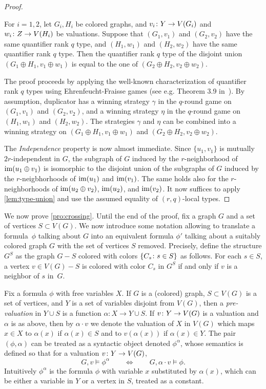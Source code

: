 \begin{proof}
		\begin{claim}\label{lem:type-union}
			For $i=1,2$, let $G_i,H_i$ be colored graphs,
			and $v_i\colon Y\to V(G_i)$ and $w_i\colon Z\to V(H_i)$ be valuations.
			Suppose that $(G_1,v_1)$ and $(G_2,v_2)$ 
			have the same quantifier rank $q$ type,
			and $(H_1,w_1)$ and $(H_2,w_2)$ 
			have the same quantifier rank $q$ type.
			Then the quantifier rank $q$ type of the disjoint union 
			$(G_1\oplus H_1,v_1\oplus w_1)$ is equal to the one of $(G_2\oplus H_2,v_2\oplus w_2)$. \end{claim}
\begin{clproof}[Sketch]
	The proof proceeds by applying the well-known characterization 
	of quantifier rank $q$  types using Ehrenfeucht-Fraisse games (see e.g. Theorem 3.9 in~\cite{libkin}). By assumption, duplicator has a winning strategy $\gamma$ in the $q$-round game on $(G_1,v_1)$ and $(G_2,v_2)$, and a winning strategy $\eta$ in the $q$-round game on $(H_1,w_1)$ and $(H_2,w_2)$. The strategies $\gamma$ and $\eta$ can be combined into a winning strategy on $(G_1\oplus H_1,v_1\oplus w_1)$  and $(G_2\oplus H_2,v_2\oplus w_2)$.
\end{clproof}
The \emph{Independence} property is now almost immediate. Since $\{u_1,v_1\}$ is mutually $2r$-independent in $G$, the subgraph of $G$ induced by the $r$-neighborhood of $\mathrm{im}(u_1\oplus v_1)$ is isomorphic to the disjoint union of the subgraphs of $G$ induced by the $r$-neigbhorhoods of $\mathrm{im}(u_1)$ and $\mathrm{im}(v_1)$. The same holds also for the $r$-neighborhoods of $\mathrm{im}(u_2\oplus v_2)$, 
$\mathrm{im}(u_2)$, and $\mathrm{im}(v_2)$. It now suffices to apply \cref{lem:type-union} and use the assumed equality of $(r,q)$-local types.
\end{proof}

We now prove \cref{pro:crossing}. Until the end of the proof, fix a graph $G$ and a set of vertices $S\subset V(G)$.
We now introduce some notation allowing to translate a  formula~$\phi$ talking about  $G$ into an equivalent formula $\phi'$ talking 
about a suitably colored  graph $G$ with the set of vertices $S$ removed.
Precisely, define the structure $G^{S}$
as the graph $G-S$ colored with colors $\{C_s\colon s\in S\}$ as follows.
For each $s\in S$, a vertex $v\in V(G)-S$
is colored with color $C_s$ in $G^S$ if and only if $v$ is a neighbor of $s$
in~$G$.

Fix a formula $\phi$ with free variables $X$.
If $G$ is a (colored) graph, $S\subset V(G)$ is a set of vertices, and $Y$ is a set of variables disjoint from $V(G)$, then 
a \emph{pre-valuation} in $Y\cup S$ is a 
function $\alpha\colon X\to Y\cup S$.
If $v\colon Y\to V(G)$ is a valuation and $\alpha$ is as above,
then by $\alpha\cdot v$ we denote the valuation of $X$ in $V(G)$
which maps $x\in X$ to $\alpha(x) $ if $\alpha(x)\in S$
and to $v(\alpha(x))$ if $\alpha(x)\in Y$.
 The  pair $(\phi,\alpha)$  can be treated as a
syntactic object denoted  $\phi^{\alpha}$,
 whose semantics is defined so that for a valuation $v\colon Y\to V(G)$, 
$$G,v\models \phi^{\alpha}\qquad\iff \qquad G,\alpha\cdot v\models \phi.$$
Intuitively $\phi^\alpha$ is the formula $\phi$ with variable $x$ substituted by $\alpha(x)$,
which can be either a variable in $Y$ or a vertex in $S$, treated as a constant.



